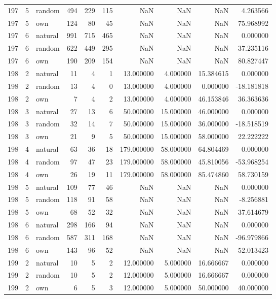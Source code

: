 \begin{table}[htbp]
\begin{tabular}{rrlrrrrrrr}
197 & 5 & random & 494 & 229 & 115 & NaN & NaN & NaN & 4.263566 \\
197 & 5 & own & 124 & 80 & 45 & NaN & NaN & NaN & 75.968992 \\
197 & 6 & natural & 991 & 715 & 465 & NaN & NaN & NaN & 0.000000 \\
197 & 6 & random & 622 & 449 & 295 & NaN & NaN & NaN & 37.235116 \\
197 & 6 & own & 190 & 209 & 154 & NaN & NaN & NaN & 80.827447 \\
198 & 2 & natural & 11 & 4 & 1 & 13.000000 & 4.000000 & 15.384615 & 0.000000 \\
198 & 2 & random & 13 & 4 & 0 & 13.000000 & 4.000000 & 0.000000 & -18.181818 \\
198 & 2 & own & 7 & 4 & 2 & 13.000000 & 4.000000 & 46.153846 & 36.363636 \\
198 & 3 & natural & 27 & 13 & 6 & 50.000000 & 15.000000 & 46.000000 & 0.000000 \\
198 & 3 & random & 32 & 14 & 7 & 50.000000 & 15.000000 & 36.000000 & -18.518519 \\
198 & 3 & own & 21 & 9 & 5 & 50.000000 & 15.000000 & 58.000000 & 22.222222 \\
198 & 4 & natural & 63 & 36 & 18 & 179.000000 & 58.000000 & 64.804469 & 0.000000 \\
198 & 4 & random & 97 & 47 & 23 & 179.000000 & 58.000000 & 45.810056 & -53.968254 \\
198 & 4 & own & 26 & 19 & 11 & 179.000000 & 58.000000 & 85.474860 & 58.730159 \\
198 & 5 & natural & 109 & 77 & 46 & NaN & NaN & NaN & 0.000000 \\
198 & 5 & random & 118 & 91 & 58 & NaN & NaN & NaN & -8.256881 \\
198 & 5 & own & 68 & 52 & 32 & NaN & NaN & NaN & 37.614679 \\
198 & 6 & natural & 298 & 166 & 94 & NaN & NaN & NaN & 0.000000 \\
198 & 6 & random & 587 & 311 & 168 & NaN & NaN & NaN & -96.979866 \\
198 & 6 & own & 143 & 96 & 52 & NaN & NaN & NaN & 52.013423 \\
199 & 2 & natural & 10 & 5 & 2 & 12.000000 & 5.000000 & 16.666667 & 0.000000 \\
199 & 2 & random & 10 & 5 & 2 & 12.000000 & 5.000000 & 16.666667 & 0.000000 \\
199 & 2 & own & 6 & 5 & 3 & 12.000000 & 5.000000 & 50.000000 & 40.000000 \\

\end{tabular}
\end{table}
